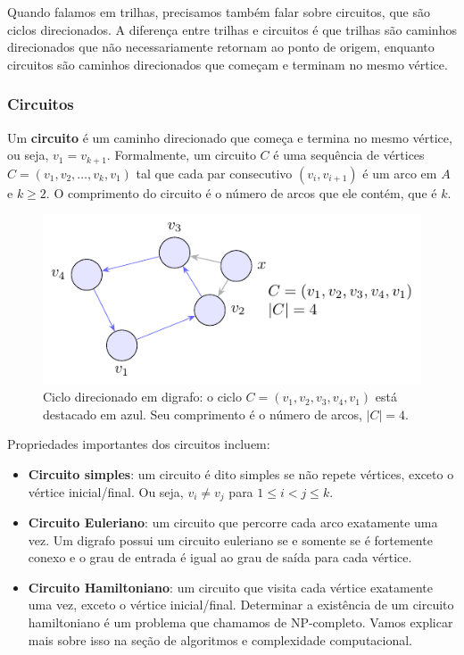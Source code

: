 Quando falamos em trilhas, precisamos também falar sobre circuitos, que são ciclos direcionados.
A diferença entre trilhas e circuitos é que trilhas são caminhos direcionados que não necessariamente retornam ao ponto de origem, enquanto circuitos são caminhos direcionados que começam e terminam no mesmo vértice.

\subsubsection{Circuitos}

Um \textbf{circuito} é um caminho direcionado que começa e termina no mesmo vértice, ou seja, \(v_1 = v_{k+1}\). Formalmente, um circuito \(C\) é uma sequência de vértices \(C = (v_1, v_2, \ldots, v_k, v_1)\) tal que cada par consecutivo \((v_i, v_{i+1})\) é um arco em \(A\) e \(k \geq 2\). O comprimento do circuito é o número de arcos que ele contém, que é \(k\).


\begin{figure}[H]
	\centering
	\includegraphics[width=0.9\linewidth]{figures/fig_ciclo_direcionado.pdf}

	\caption{Ciclo direcionado em digrafo: o ciclo $C=(v_1,v_2,v_3,v_4,v_1)$ está destacado em azul. Seu comprimento é o número de arcos, $|C|=4$.}
	\label{fig:ciclo-direcionado}\end{figure}



Propriedades importantes dos circuitos incluem:
\begin{itemize}
	\item \textbf{Circuito simples}: um circuito é dito simples se não repete vértices, exceto o vértice inicial/final. Ou seja, \(v_i \neq v_j\) para \(1 \leq i < j \leq k\).
	\item \textbf{Circuito Euleriano}: um circuito que percorre cada arco exatamente uma vez. Um digrafo possui um circuito euleriano se e somente se é fortemente conexo e o grau de entrada é igual ao grau de saída para cada vértice.
	\item \textbf{Circuito Hamiltoniano}: um circuito que visita cada vértice exatamente uma vez, exceto o vértice inicial/final. Determinar a existência de um circuito hamiltoniano é um problema que chamamos de NP-completo. Vamos explicar mais sobre isso na seção de algoritmos e complexidade computacional.
\end{itemize}


